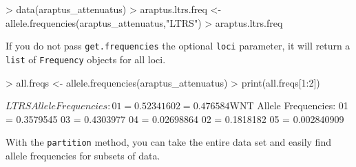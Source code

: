\documentclass[letterpaper,twoside,openany]{book}
\begin{document}
\begin{Schunk}
\begin{Sinput}
> data(araptus_attenuatus)
> araptus.ltrs.freq <- allele.frequencies(araptus_attenuatus,"LTRS")
> araptus.ltrs.freq
\end{Sinput}
\end{Schunk}

If you do not pass \texttt{get.frequencies} the optional \texttt{loci} parameter, it will return a \texttt{list} of \texttt{Frequency} objects for all loci.

\begin{Schunk}
\begin{Sinput}
> all.freqs <- allele.frequencies(araptus_attenuatus)
> print(all.freqs[1:2])
\end{Sinput}
\begin{Soutput}
$LTRS
Allele Frequencies:
  01 = 0.523416 
  02 = 0.476584 

$WNT
Allele Frequencies:
  01 = 0.3579545 
  03 = 0.4303977 
  04 = 0.02698864 
  02 = 0.1818182 
  05 = 0.002840909 
\end{Soutput}
\end{Schunk}

With the \texttt{partition} method, you can take the entire data set and easily find allele frequencies for subsets of data.
\end{document}
